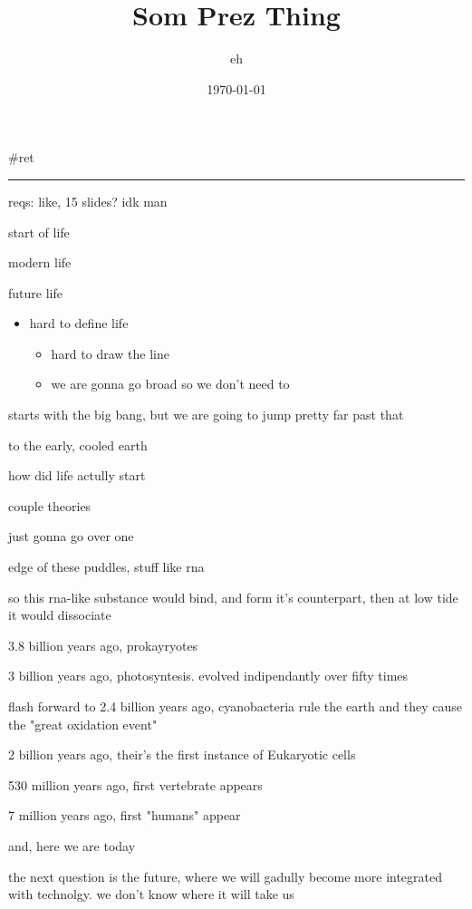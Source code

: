 \documentclass[letterpaper]{article}
\author{eh}
\date{\today}
\title{Som Prez Thing}
\renewcommand{\tableofcontents}{}
\begin{document}
\tableofcontents

\#ret

\noindent\rule{\textwidth}{0.5pt}

reqs: like, 15 slides? idk man

start of life

modern life

future life

\begin{itemize}
\item hard to define life

\begin{itemize}
\item hard to draw the line
\item we are gonna go broad so we don't need to
\end{itemize}
\end{itemize}

starts with the big bang, but we are going to jump pretty far past that

to the early, cooled earth

how did life actully start

couple theories

just gonna go over one

edge of these puddles, stuff like rna

so this rna-like substance would bind, and form it's counterpart, then
at low tide it would dissociate

3.8 billion years ago, prokayryotes

3 billion years ago, photosyntesis. evolved indipendantly over fifty
times

flash forward to 2.4 billion years ago, cyanobacteria rule the earth and
they cause the "great oxidation event"

2 billion years ago, their's the first instance of Eukaryotic cells

530 million years ago, first vertebrate appears

7 million years ago, first "humans" appear

and, here we are today

the next question is the future, where we will gadully become more
integrated with technolgy. we don't know where it will take us
\end{document}
